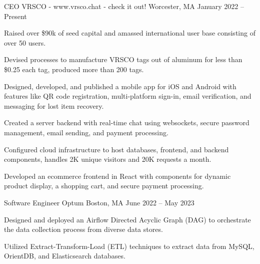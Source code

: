 

\begin{cventries}

  \cventry
    {CEO} %
    {VRSCO - www.vrsco.chat - check it out!} %
    {Worcester, MA} %
    {January 2022 – Present}
    {
      \begin{cvitems} %
      \item {Raised over \$90k of seed capital and amassed international user base consisting of over 50 users.}
      \item {Devised processes to manufacture VRSCO tags out of aluminum for less than \$0.25 each tag, produced more than 200 tags.}
      \item {Designed, developed, and published a mobile app for iOS and Android with features like QR code registration, multi-platform sign-in, email verification, and messaging for lost item recovery.}
      \item {Created a server backend with real-time chat using websockets, secure password management, email sending, and payment processing.}
      \item {Configured cloud infrastructure to host databases, frontend, and backend components, handles 2K unique visitors and 20K requests a month.}
      \item {Developed an ecommerce frontend in React with components for dynamic product display, a shopping cart, and secure payment processing.}
      \end{cvitems}
    }
  \cventry
    {Software Engineer} %
    {Optum} %
    {Boston, MA} %
    {June 2022 – May 2023} %
    {
      \begin{cvitems} %
        \item {Designed and deployed an Airflow Directed Acyclic Graph (DAG) to orchestrate the data collection process from diverse data stores.}
        \item {Utilized Extract-Transform-Load (ETL) techniques to extract data from MySQL, OrientDB, and Elasticsearch databases.}

\end{cvitems}}
\end{cventries}

